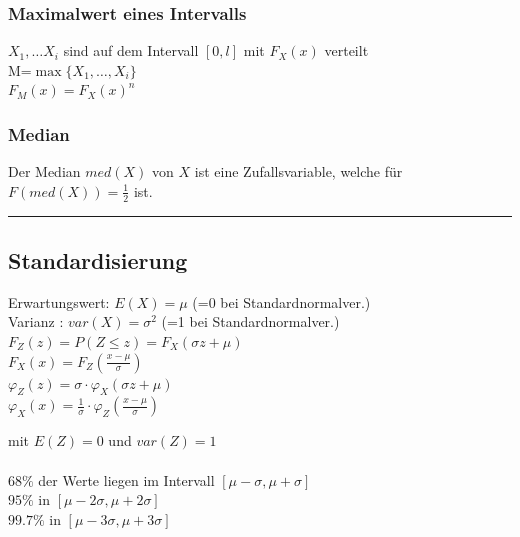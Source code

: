     \begin{multicols}{2}    
      \subsubsection{Maximalwert eines Intervalls}
        $X_1,\ldots X_i$ sind auf dem Intervall $[0,l]$ mit $F_X(x)$ verteilt\\
        M=$\max \{ X_1,\ldots,X_i\} $ \\
        $F_M(x)=F_X(x)^n$ \\
    \columnbreak
      \subsubsection{Median }
        Der Median $med(X)$ von $X$ ist eine Zufallsvariable, welche für
        $F(med(X)) = \frac{1}{2}$ ist.
      
    \end{multicols}

\hrule

  \subsection{Standardisierung }
    \begin{multicols}{2}
      Erwartungswert: $E(X)=\mu$ \hspace{4mm}(=0 bei Standardnormalver.)\\ 
      Varianz \hspace{11.5mm}: $var(X)=\sigma^2$ (=1 bei Standardnormalver.)\\

      $F_Z(z) = P(Z \leq z) = F_X(\sigma z + \mu)$ \\
      $F_X(x) = F_Z(\frac{x-\mu}{\sigma})$\\
      $\varphi_Z(z) = \sigma \cdot \varphi_X(\sigma z + \mu)$\\
      $\varphi_X(x) = \frac{1}{\sigma} \cdot \varphi_Z(\frac{x - \mu}{\sigma})$ \\
      
    \columnbreak
    
       \hspace{5mm} mit $E(Z) = 0$ und $var(Z) = 1$\\ \\
      
      $68\% $ der Werte liegen im Intervall $[ \mu - \sigma, \mu + \sigma]$ \\ 
      $95\% $ in $[ \mu - 2\sigma, \mu + 2\sigma]$ \\
      $99.7\% $ in $[ \mu - 3\sigma, \mu + 3\sigma]$ \\
    
    \end{multicols}

